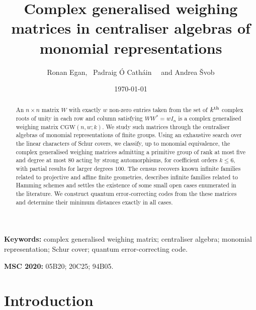\documentclass{article}
\title{Complex generalised weighing matrices in centraliser algebras of monomial representations}
\author{
Ronan Egan\footnotemark[2],~
Padraig \'{O} Cath\'{a}in\footnotemark[3]~~
and Andrea {\v S}vob\footnotemark[1]}
\date{
\today
}
\theoremstyle{definition}
\theoremstyle{remark}
\newcommand{\CGW}{\mathrm{CGW}}
\begin{document}
\maketitle

\begin{abstract}
An $n \times n$ matrix $W$ with exactly $w$ non-zero entries taken from the set of $k^{\rm th}$ complex roots of unity in each row and column satisfying $WW^{\ast} = wI_n$ is a complex generalised weighing matrix $\CGW(n,w;k)$.
We study such matrices through the centraliser algebras of monomial representations of finite groups. Using an exhaustive search over the linear characters of Schur covers, we classify, up to monomial equivalence, the complex generalised weighing matrices admitting a primitive group of rank at most five and degree at most $80$ acting by strong automorphisms, for coefficient orders $k \leq 6$, with partial results for larger degrees $100$. The census recovers known infinite families related to projective and affine finite geometries, describes infinite families related to Hamming schemes and settles the existence of some small open cases enumerated in the literature. We construct quantum error-correcting codes from the these matrices and determine their minimum distances exactly in all cases.
\end{abstract}

\renewcommand{\thefootnote}{\fnsymbol{footnote}}
\renewcommand{\thefootnote}{\roman{footnote}}

\noindent\textbf{Keywords:} complex generalised weighing matrix;
centraliser algebra; monomial representation; Schur cover; quantum
error-correcting code.

\noindent\textbf{MSC 2020:} 05B20; 20C25; 94B05.

\section{Introduction}
\end{document}
